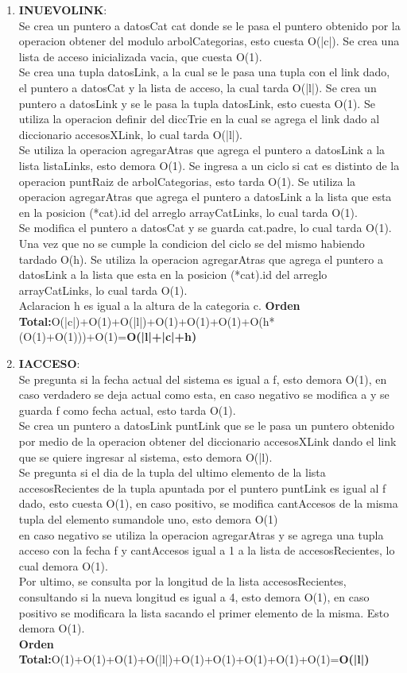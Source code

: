 \documentclass[10pt, a4paper]{article}
\begin{document}
\begin{enumerate}
     \item \textbf{INUEVOLINK}:\\Se crea un puntero a datosCat cat donde se le pasa el puntero obtenido por la operacion obtener del modulo arbolCategorias, esto cuesta O(|c|). Se crea una lista de acceso  inicializada vacia, que cuesta O(1).\\
Se crea una tupla datosLink, a la cual se le pasa una tupla con el link dado, el puntero a datosCat y la lista de acceso, la cual tarda O(|l|). Se crea un puntero a datosLink y se le pasa la tupla datosLink, esto cuesta O(1).  Se utiliza la operacion definir del diccTrie en la cual se agrega el link dado al diccionario accesosXLink, lo cual tarda O(|l|).\\
Se utiliza la operacion agregarAtras que agrega el puntero a datosLink a la lista listaLinks, esto demora O(1).  Se ingresa a un ciclo si cat es distinto de la operacion puntRaiz de arbolCategorias, esto tarda O(1). Se utiliza la operacion agregarAtras que agrega el puntero a datosLink a la lista que esta en la posicion (*cat).id del arreglo arrayCatLinks, lo cual tarda O(1).\\
Se modifica el puntero a datosCat y se guarda cat.padre, lo cual tarda O(1). Una vez que no se cumple la condicion del ciclo se del mismo habiendo tardado O(h). Se utiliza la operacion agregarAtras que agrega el puntero a datosLink a la lista que esta en la posicion (*cat).id del arreglo arrayCatLinks, lo cual tarda O(1).\\
Aclaracion h es igual a la altura de la categoria c.
\textbf{Orden Total:}O(|c|)+O(1)+O(|l|)+O(1)+O(1)+O(1)+O(h*(O(1)+O(1)))+O(1)=\textbf{O(|l|+|c|+h)}


     \item \textbf{IACCESO}:\\ Se pregunta si la fecha actual del sistema es igual a f, esto demora O(1), en caso verdadero se deja actual como esta, en caso negativo se modifica a y se guarda f como fecha actual, esto tarda O(1).\\
Se crea un puntero a datosLink puntLink que se le pasa un puntero obtenido por medio de la operacion obtener del diccionario accesosXLink dando el link que se quiere ingresar al sistema, esto demora O(|l). \\
Se pregunta si el dia de la tupla del ultimo elemento de la lista accesosRecientes de la tupla apuntada por el puntero puntLink es igual al f dado, esto cuesta O(1), en caso positivo, se modifica cantAccesos de la misma tupla del elemento sumandole uno, esto demora O(1) \\
en caso negativo se utiliza la operacion agregarAtras y se agrega una tupla acceso con la fecha f y cantAccesos igual a 1 a la lista de accesosRecientes, lo cual demora O(1). \\
Por ultimo, se consulta por la longitud de la lista accesosRecientes, consultando si la nueva longitud es igual a 4, esto demora O(1), en caso positivo se modificara la lista sacando el primer elemento de la misma. Esto demora O(1).\\
\textbf{Orden Total:}O(1)+O(1)+O(1)+O(|l|)+O(1)+O(1)+O(1)+O(1)+O(1)=\textbf{O(|l|)}


\end{enumerate}
\end{document}
